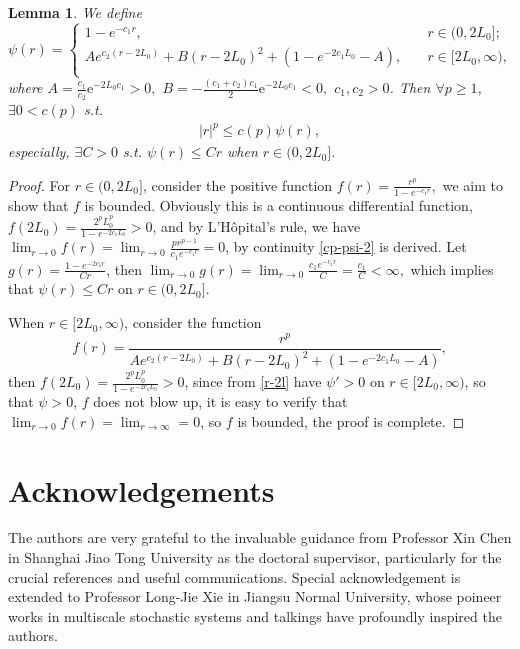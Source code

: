 \documentclass[11pt,reqno]{amsart}
\newtheorem{lemma}{\indent Lemma}[section]
\numberwithin{equation}{section}
\begin{document}
\begin{lemma}\label{cp-psi}
We define
$$\psi(r)=
\begin{cases}
	1-e^{-c_1r}, & \quad r\in(0,2L_0];\\
	Ae^{c_2(r-2L_0)}+B(r-2L_0)^2+ (1-e^{-2c_1L_0}-A
	), & \quad r\in [2L_0,\infty),\\
\end{cases}$$
where
$A= \frac{c_1}{c_2}\mathrm{e}^{-2L_0c_1}>0,$ $B= -\frac{(c_1+c_2)c_1}{2}\mathrm{e}^{-2L_0c_1}<0,$
$c_1,c_2>0$. Then $\forall p\geq1$, $\exists 0<c(p)$ s.t. 
\begin{align}\label{cp-psi-2}
	|r|^p\leq c(p)\psi(r),
\end{align}
especially, $\exists C>0$ s.t. $\psi(r)\leq Cr$ when $r\in(0,2L_0]$.
\end{lemma}
\begin{proof}
For $r\in(0,2L_0]$, consider the positive function
$ f(r)=\frac{r^p}{1-e^{-c_1r}},$
we aim to show that $f$ is bounded. Obviously this is a continuous differential function, $f(2L_0)=\frac{2^pL_0^{p}}{1-e^{-2c_1L_0}}>0$, and by L'H\^{o}pital's rule, we have  $\lim_{r\rightarrow0} f(r)=\lim_{r\rightarrow0}\frac{pr^{p-1}}{c_1e^{-c_1r}}=0$, by continuity \eqref{cp-psi-2} is derived. Let $g(r)=\frac{1-e^{-2c_1r}}{Cr}$, then $\lim_{r\rightarrow0} g(r)=\lim_{r\rightarrow0}\frac{c_1e^{-c_1r}}{C}=\frac{c_1}{C}<\infty,$ which implies that $\psi(r)\leq Cr$ on $r\in(0,2L_0]$.
	
When $r\in [2L_0,\infty)$,  consider the function
$$ f(r)=\frac{r^p}{Ae^{c_2(r-2L_0)}+B(r-2L_0)^2+(1-e^{-2c_1L_0}-A)},$$
then $f(2L_0)=\frac{2^pL_0^{p}}{1-e^{-2c_1L_0}}>0$, since from \eqref{r-2l} have $\psi'>0$ on  $r\in [2L_0,\infty)$, so that $\psi>0$, $f$ does not blow up, it is easy to verify that $\lim_{r\rightarrow0} f(r)=\lim_{r\rightarrow\infty}=0$, so $f$ is bounded, the proof is complete.
\end{proof}





\section*{Acknowledgements}
The authors are very grateful to the invaluable guidance from Professor Xin Chen in Shanghai Jiao Tong University as the doctoral supervisor, particularly for  the crucial references and useful communications. Special acknowledgement is extended to  Professor Long-Jie Xie in Jiangsu Normal University, whose poineer works in multiscale stochastic systems and talkings have profoundly inspired the authors.
\end{document}
